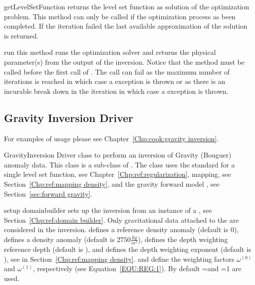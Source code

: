 \begin{methoddesc}[InversionDriver]{getLevelSetFunction}{}
returns the level set function as solution of the optimization problem.
This method can only be called if the optimization process as been completed.
If the iteration failed the last available approximation of the solution is returned.
\end{methoddesc}
        
\begin{methoddesc}[InversionDriver]{run}{}
this method runs the optimization solver and returns the physical parameter(s)
from the output of the inversion. Notice that the  method must be
called before the first call of .
The call can fail as the maximum number of iterations is reached in which case
a  exception is thrown or as there is an
incurable break down in the iteration in which case a  exception is thrown. 
\end{methoddesc}

\subsection{Gravity Inversion Driver}
For examples of usage please see Chapter~\ref{Chp:cook:gravity inversion}.

\begin{classdesc}{GravityInversion}{}
Driver class to perform an inversion of Gravity (Bouguer) anomaly data.
This class is a sub-class of . The class uses the
standard  for a single level set function,
see Chapter~\ref{Chp:ref:regularization},  mapping,
see Section~\ref{Chp:ref:mapping density}, and the gravity forward model
, see Section~\ref{sec:forward gravity}.
\end{classdesc}

\begin{methoddesc}[GravityInversion]{setup}{
domainbuilder
}
sets up the inversion from an instance  of a , see Section~\ref{Chp:ref:domain builder}.
Only gravitational data attached to the  are considered in the inversion.
 defines a reference density anomaly (default is 0), 
 defines a density anomaly (default is $2750 \frac{kg}{m^3}$),
 defines the depth weighting reference depth (default is \None), and
 defines the depth weighting exponent (default is \None),
see  in Section~\ref{Chp:ref:mapping density}.
 and  define the weighting factors
$\omega^{(0)}$ and
$\omega^{(1)}$, respectively (see Equation~\ref{EQU:REG:1}).
By default =\None and =1 are used.
\end{methoddesc}

